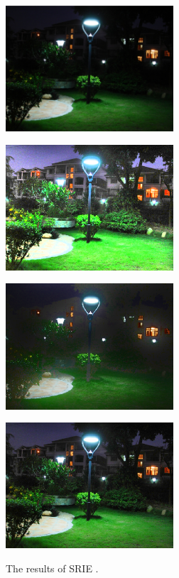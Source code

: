 \begin{figure}[tb]
	\begin{minipage}[b]{0.5\hsize}
		\centering
		\includegraphics[width=62.5mm]{images/variational/input.eps}
		 \label{fig:variational/input}
	\end{minipage}
	\begin{minipage}[b]{0.5\hsize}
		\centering
		\includegraphics[width=62.5mm]{images/variational/reflectance.eps}
		 \label{fig:variational/reflectance}
	\end{minipage}
	\begin{minipage}[b]{0.5\hsize}
		\centering
		\includegraphics[width=62.5mm]{images/variational/illumination.eps}
		 \label{fig:variational/illumination}
	\end{minipage}
	\begin{minipage}[b]{0.5\hsize}
		\centering
		\includegraphics[width=62.5mm]{images/variational/output.eps}
		 \label{fig:variational/output}
	\end{minipage}
	\caption{The results of SRIE \cite{srie}.}
	\label{fig:variational/srie}
\end{figure}

